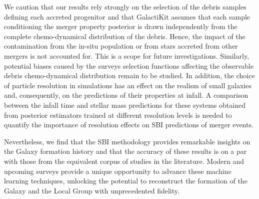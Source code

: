 We caution that our results rely strongly on the selection of the debris samples defining each accreted progenitor and that GalactiKit assumes that each sample conditioning the merger property posterior is drawn independently from the complete chemo-dynamical distribution of the debris. Hence, the impact of the contamination from the in-situ population or from stars accreted from other mergers is not accounted for. This is a scope for future investigations. Similarly, potential biases caused by the surveys selection functions affecting the observable debris chemo-dynamical distribution remain to be studied. In addition, the choice of particle resolution in simulations has an effect on the realism of small galaxies and, consequently, on the predictions of their properties at infall. A comparison between the infall time and stellar mass predictions for these systems obtained from posterior estimators trained at different resolution levels is needed to quantify the importance of resolution effects on SBI predictions of merger events.


Nevertheless, we find that the SBI methodology provides remarkable insights on the Galaxy formation history and that the accuracy of these results is on a par with those from the equivalent corpus of studies in the literature. Modern and upcoming surveys provide a unique opportunity to advance these machine learning techniques, unlocking the potential to reconstruct the formation of the Galaxy and the Local Group with unprecedented fidelity. 

